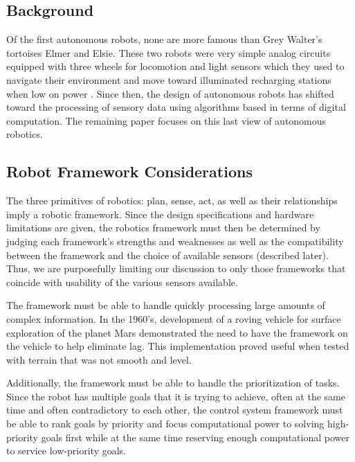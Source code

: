 








\subsection*{Background}
Of the first autonomous robots, none are more famous than Grey Walter's tortoises Elmer and Elsie. These two robots were very simple analog circuits equipped with three wheels for locomotion and light sensors which they used to navigate their environment and move toward illuminated recharging stations when low on power \cite{Walter:1950}. Since then, the design of autonomous robots has shifted toward the processing of sensory data using algorithms based in terms of digital computation. The remaining paper focuses on this last view of autonomous robotics.

\subsection*{Robot Framework Considerations}
The three primitives of robotics: plan, sense, act, as well as their relationships imply a robotic framework. Since the design specifications and hardware limitations are given, the robotics framework must then be determined by judging each framework's strengths and weaknesses as well as the compatibility between the framework and the choice of available sensors (described later). Thus, we are purposefully limiting our discussion to only those frameworks that coincide with usability of the various sensors available.

The framework must be able to handle quickly processing large amounts of complex information. In the 1960’s, development of a roving vehicle for surface exploration of the planet Mars demonstrated the need to have the framework on the vehicle to help eliminate lag. This implementation proved useful when tested with terrain that was not smooth and level. \cite{Hogle}

Additionally, the framework must be able to handle the prioritization of tasks. Since the robot has multiple goals that it is trying to achieve, often at the same time and often contradictory to each other, the control system framework must be able to rank goals by priority and focus computational power to solving high-priority goals first while at the same time reserving enough computational power to service low-priority goals.

